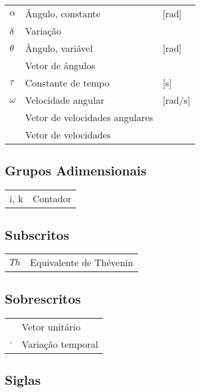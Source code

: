 \begin{tabular}{p{}p{}>{\PreserveBacklash\raggedleft}p{}}
$\alpha$            & Ângulo, constante                 & {[}rad{]}     \tabularnewline
$\delta$            & Variação                          &               \tabularnewline
$\theta$            & Ângulo, variável                  & {[}rad{]}     \tabularnewline
\boldmath{$\Theta$} & Vetor de ângulos                  &               \tabularnewline
$\tau$              & Constante de tempo                & {[}s{]}       \tabularnewline
$\omega$            & Velocidade angular                & {[}rad/s{]}   \tabularnewline
\boldmath{$\omega$} & Vetor de velocidades angulares    &               \tabularnewline
\boldmath{$\nu$}    & Vetor de velocidades              &               \tabularnewline
\end{tabular}


\subsection*{Grupos Adimensionais}

\begin{tabular}{p{}p{}}
i, k    &   Contador    \tabularnewline
\end{tabular}


\subsection*{Subscritos}

\begin{tabular}{p{}p{}}
$Th$    & Equivalente de Thévenin   \tabularnewline
\end{tabular}


\subsection*{Sobrescritos}

\begin{tabular}{p{}p{}}
$\hat{}$    & Vetor unitário    \tabularnewline
$\cdot$     & Variação temporal \tabularnewline
\end{tabular}


\subsection*{Siglas}

